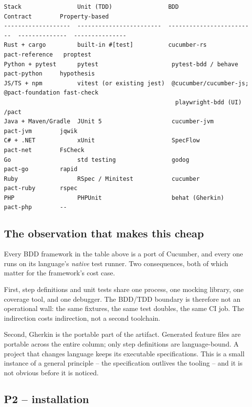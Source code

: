 \documentclass[11pt,a4paper]{article}
\begin{document}
\begin{Verbatim}[fontsize=\footnotesize,breaklines=true,breakanywhere=true,breakautoindent=false,samepage=false]
Stack                Unit (TDD)                BDD                        Contract        Property-based
-------------------  ------------------------  -------------------------  --------------  ---------------
Rust + cargo         built-in #[test]          cucumber-rs                pact-reference   proptest
Python + pytest      pytest                     pytest-bdd / behave        pact-python     hypothesis
JS/TS + npm          vitest (or existing jest)  @cucumber/cucumber-js;      @pact-foundation fast-check
                                                 playwright-bdd (UI)        /pact
Java + Maven/Gradle  JUnit 5                    cucumber-jvm               pact-jvm        jqwik
C# + .NET            xUnit                      SpecFlow                    pact-net        FsCheck
Go                   std testing                godog                       pact-go         rapid
Ruby                 RSpec / Minitest           cucumber                    pact-ruby       rspec
PHP                  PHPUnit                    behat (Gherkin)             pact-php        --
\end{Verbatim}

\subsection{The observation that makes this cheap}

Every BDD framework in the table above is a port of Cucumber, and every one runs on its language's \emph{native} test runner. Two consequences, both of which matter for the framework's cost case.

First, step definitions and unit tests share one process, one mocking library, one coverage tool, and one debugger. The BDD/TDD boundary is therefore not an operational wall: the same fixtures, the same test doubles, the same CI job. The indirection costs indirection, not a second toolchain.

Second, Gherkin is the portable part of the artifact. Generated feature files are portable across the entire column; only step definitions are language-bound. A project that changes language keeps its executable specifications. This is a small instance of a general principle -- the specification outlives the tooling -- and it is not obvious before it is noticed.

\subsection{P2 -- installation}
\end{document}
